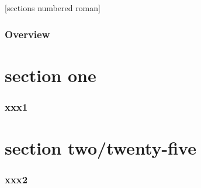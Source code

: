 \documentclass[t, sansserif, onlymath, 10pt]{beamer}%
\begin{document}
[sections numbered roman]

\begin{frame}
  \frametitle{Overview}
  \tableofcontents
\end{frame}

\section{section one}
\begin{frame}
  \frametitle{xxx1 \thesection}
\end{frame}

\makeatletter
{}
\makeatother

\section{section two/twenty-five}
\begin{frame}
  \frametitle{xxx2 \thesection}
\end{frame}
\end{document}
